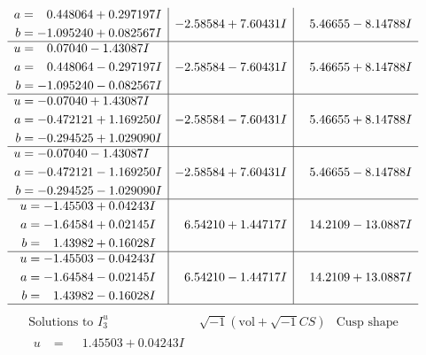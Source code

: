 \documentclass[1p]{elsarticle_modified}
\theoremstyle{definition}
\newcommand{\I}{\sqrt{-1}}
\begin{document}
$$\begin{array}{c|c|c}
\begin{aligned}
a &= \phantom{-}0.448064 + 0.297197 I \\
b &= -1.095240 + 0.082567 I\end{aligned}
 & -2.58584 + 7.60431 I & \phantom{-}5.46655 - 8.14788 I \\ \hline\begin{aligned}
u &= \phantom{-}0.07040 - 1.43087 I \\
a &= \phantom{-}0.448064 - 0.297197 I \\
b &= -1.095240 - 0.082567 I\end{aligned}
 & -2.58584 - 7.60431 I & \phantom{-}5.46655 + 8.14788 I \\ \hline\begin{aligned}
u &= -0.07040 + 1.43087 I \\
a &= -0.472121 + 1.169250 I \\
b &= -0.294525 + 1.029090 I\end{aligned}
 & -2.58584 - 7.60431 I & \phantom{-}5.46655 + 8.14788 I \\ \hline\begin{aligned}
u &= -0.07040 - 1.43087 I \\
a &= -0.472121 - 1.169250 I \\
b &= -0.294525 - 1.029090 I\end{aligned}
 & -2.58584 + 7.60431 I & \phantom{-}5.46655 - 8.14788 I \\ \hline\begin{aligned}
u &= -1.45503 + 0.04243 I \\
a &= -1.64584 + 0.02145 I \\
b &= \phantom{-}1.43982 + 0.16028 I\end{aligned}
 & \phantom{-}6.54210 + 1.44717 I & \phantom{-}14.2109 - 13.0887 I \\ \hline\begin{aligned}
u &= -1.45503 - 0.04243 I \\
a &= -1.64584 - 0.02145 I \\
b &= \phantom{-}1.43982 - 0.16028 I\end{aligned}
 & \phantom{-}6.54210 - 1.44717 I & \phantom{-}14.2109 + 13.0887 I\\
 \hline 
 \end{array}$$\newpage$$\begin{array}{c|c|c}  
\text{Solutions to }I^u_{3}& \I (\text{vol} + \sqrt{-1}CS) & \text{Cusp shape}\\
 \hline 
\begin{aligned}
u &= \phantom{-}1.45503 + 0.04243 I \\

\end{aligned}
\end{array}$$
\end{document}
